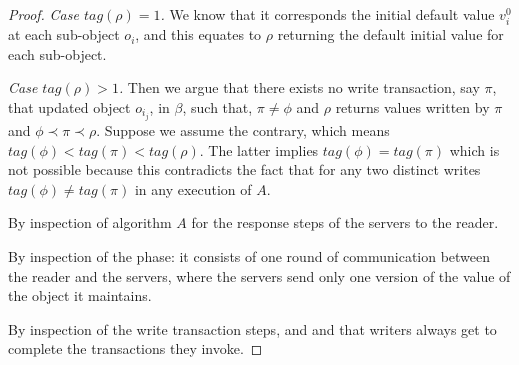 \begin{proof}
	\emph{Case $tag(\rho) = 1$.} We  know that it corresponds the initial default value $v_i^0$ at each sub-object $o_i$, and this equates to $\rho$ returning the default initial value for each sub-object.
	 
	 \emph{Case $tag(\rho) > 1$.} Then we argue that there exists no {\sc write} transaction, say $\pi$, that updated object $o_{i_j}$,   in $\beta$, such that,  $\pi \neq \phi$ and $\rho$ returns values written by $\pi$ and $\phi \prec \pi \prec \rho$. Suppose we assume the 	contrary, which means $tag(\phi) < tag(\pi) < tag(\rho)$. The latter implies $tag(\phi)  = tag(\pi)$ which is not possible because 
	this contradicts the fact that for any two distinct {\sc write}s $tag(\phi) \neq tag(\pi)$  in any execution of   $A$.
	
	  By inspection of algorithm $A$ for the  response steps  of the servers to the reader.
	
	 By inspection of the  {\readValue} phase: it consists of one round of communication between the reader and the servers, where the servers send only one version of the value of the object it maintains.
	
	  By inspection of the {\sc write} transaction steps, and  and  that writers always get to complete the transactions they invoke.
	\end{proof}

